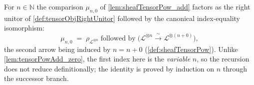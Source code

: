 \begin{lemma}
  \label{lem:tensorPowAdd_rightUnit}
  For \(n \in \mathbb{N}\) the comparison \(\mu_{n,0}\) of
  \cref{lem:sheafTensorPow_add} factors as the right unitor of
  \cref{def:tensorObjRightUnitor} followed by the canonical index-equality
  isomorphism:
  \[
    \mu_{n,0}
      \;=\;
      \rho_{\mathcal{L}^{\otimes n}}
      \;\textrm{followed by}\;
      \bigl(\mathcal{L}^{\otimes n}
        \xrightarrow{\ \sim\ } \mathcal{L}^{\otimes (n+0)}\bigr),
  \]
  the second arrow being induced by \(n = n+0\) (\cref{def:sheafTensorPow}).
  Unlike \cref{lem:tensorPowAdd_zero}, the first index here is the \emph{variable}
  \(n\), so the recursion does not reduce definitionally; the identity is proved by
  induction on \(n\) through the successor branch.
\end{lemma}

